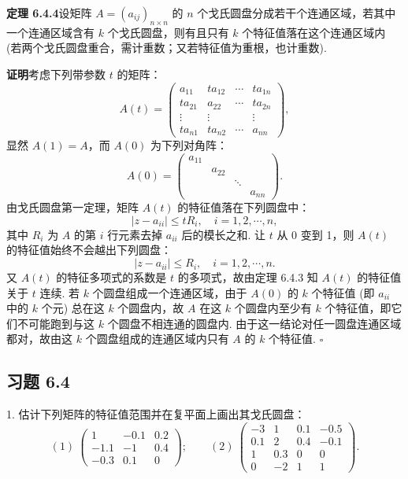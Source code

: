 \documentclass[UTF8,12pt,a4paper,fontset=fandol]{ctexart}
\begin{document}
\noindent\textbf{定理 6.4.4}\quad 设矩阵 $A=(a_{ij})_{n\times n}$ 的 $n$ 个戈氏圆盘分成若干个连通区域，若其中一个连通区域含有 $k$ 个戈氏圆盘，则有且只有 $k$ 个特征值落在这个连通区域内 (若两个戈氏圆盘重合，需计重数；又若特征值为重根，也计重数).

\noindent\textbf{证明}\quad 考虑下列带参数 $t$ 的矩阵：
\[
A(t)=\left(\begin{array}{cccc}
a_{11} & ta_{12} & \cdots & ta_{1n}\\
ta_{21} & a_{22} & \cdots & ta_{2n}\\
\vdots & \vdots & & \vdots\\
ta_{n1} & ta_{n2} & \cdots & a_{nn}
\end{array}\right),
\]
显然 $A(1)=A$，而 $A(0)$ 为下列对角阵：
\[
A(0)=\left(\begin{array}{cccc}
a_{11} & & & \\
& a_{22} & & \\
& & \ddots & \\
& & & a_{nn}
\end{array}\right).
\]
由戈氏圆盘第一定理，矩阵 $A(t)$ 的特征值落在下列圆盘中：
\[
|z-a_{ii}|\leq tR_i,\quad i=1,2,\cdots,n,
\]
其中 $R_i$ 为 $A$ 的第 $i$ 行元素去掉 $a_{ii}$ 后的模长之和. 让 $t$ 从 0 变到 1，则 $A(t)$ 的特征值始终不会越出下列圆盘：
\[
|z-a_{ii}|\leq R_i,\quad i=1,2,\cdots,n.
\]
又 $A(t)$ 的特征多项式的系数是 $t$ 的多项式，故由定理 6.4.3 知 $A(t)$ 的特征值关于 $t$ 连续. 若 $k$ 个圆盘组成一个连通区域，由于 $A(0)$ 的 $k$ 个特征值 (即 $a_{ii}$ 中的 $k$ 个元) 总在这 $k$ 个圆盘内，故 $A$ 在这 $k$ 个圆盘内至少有 $k$ 个特征值，即它们不可能跑到与这 $k$ 个圆盘不相连通的圆盘内. 由于这一结论对任一圆盘连通区域都对，故由这 $k$ 个圆盘组成的连通区域内只有 $A$ 的 $k$ 个特征值. $\square$

\subsection*{习题 6.4}

1. 估计下列矩阵的特征值范围并在复平面上画出其戈氏圆盘：
\[
(1)\ \left(\begin{array}{rrr}
1 & -0.1 & 0.2\\
-1.1 & -1 & 0.4\\
-0.3 & 0.1 & 0
\end{array}\right);\qquad
(2)\ \left(\begin{array}{rrrr}
-3 & 1 & 0.1 & -0.5\\
0.1 & 2 & 0.4 & -0.1\\
1 & 0.3 & 0 & 0\\
0 & -2 & 1 & 1
\end{array}\right).
\]
\end{document}
